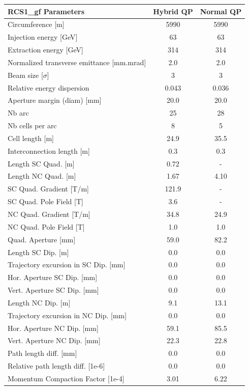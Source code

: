 \begin{tabular}{lcc}
\toprule
RCS1_gf Parameters & Hybrid QP & Normal QP \\
\midrule
Circumference [m] & 5990 & 5990 \\
Injection energy [GeV] & 63 & 63 \\
Extraction energy [GeV] & 314 & 314 \\
Normalized transverse emittance [mm.mrad] & 2.0 & 2.0 \\
Beam size [$\sigma$] & 3 & 3 \\
Relative energy dispersion & 0.043 & 0.036 \\
Aperture margin (diam) [mm] & 20.0 & 20.0 \\
Nb arc & 25 & 28 \\
Nb cells per arc & 8 & 5 \\
Cell length [m] & 24.9 & 35.5 \\
Interconnection length [m] & 0.3 & 0.3 \\
Length SC Quad. [m] & 0.72 & - \\
Length NC Quad. [m] & 1.67 & 4.10 \\
SC Quad. Gradient [T/m] & 121.9 & - \\
SC Quad. Pole Field [T] & 3.6 & - \\
NC Quad. Gradient [T/m] & 34.8 & 24.9 \\
NC Quad. Pole Field [T] & 1.0 & 1.0 \\
Quad. Aperture [mm] & 59.0 & 82.2 \\
Length SC Dip. [m] & 0.0 & 0.0 \\
Trajectory excursion in SC Dip. [mm] & 0.0 & 0.0 \\
Hor. Aperture SC Dip. [mm] & 0.0 & 0.0 \\
Vert. Aperture SC Dip. [mm] & 0.0 & 0.0 \\
Length NC Dip. [m] & 9.1 & 13.1 \\
Trajectory excursion in NC Dip. [mm] & 0.0 & 0.0 \\
Hor. Aperture NC Dip. [mm] & 59.1 & 85.5 \\
Vert. Aperture NC Dip. [mm] & 22.3 & 22.8 \\
Path length diff. [mm] & 0.0 & 0.0 \\
Relative path length diff. [1e-6] & 0.0 & 0.0 \\
Momentum Compaction Factor [1e-4] & 3.01 & 6.22 \\
\bottomrule
\end{tabular}
